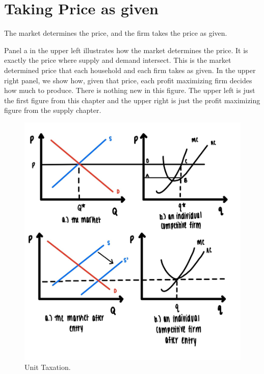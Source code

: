 \documentclass[
]{book}
\begin{document}
\hypertarget{taking-price-as-given}{%
\section{Taking Price as given}\label{taking-price-as-given}}

The market determines the price, and the firm takes the price as given.

Panel a in the upper left illustrates how the market determines the price. It is exactly the price where supply and demand intersect. This is the market determined price that each household and each firm takes as given. In the upper right panel, we show how, given that price, each profit maximizing firm decides how much to produce. There is nothing new in this figure. The upper left is just the first figure from this chapter and the upper right is just the profit maximizing figure from the supply chapter.

\begin{figure}

{\centering \includegraphics[width=1\linewidth]{img/compmarkets/fig10} 

}

\caption{Unit Taxation.}\label{fig:compmarkets10}
\end{figure}
\end{document}
